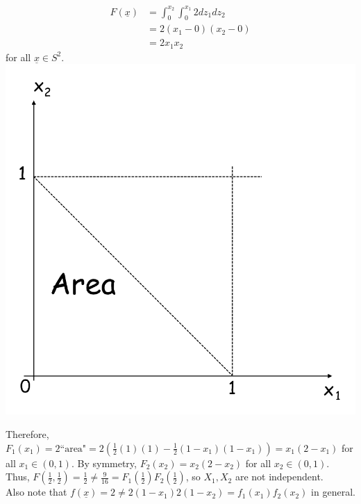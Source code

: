 \documentclass{article}
\begin{document}
\begin{myex}{}{}
\begin{enumerate}
				\begin{align*}
						F(\underline{x})&=\int_{0}^{x_2}\int_{0}^{x_1}2dz_1dz_2\\
						&=2(x_1-0)(x_2-0)\\
						&=2x_1x_2
				\end{align*}
				for all $\underline{x}\in S^2$.\\
				\includegraphics[scale=.5]{graph3.png}
				
				Therefore, $F_1(x_1)=2\mbox{``area"}=2(\frac{1}{2}(1)(1)-\frac{1}{2}(1-x_1)(1-x_1))=x_1(2-x_1)$ for all $x_1\in(0, 1)$. By symmetry, $F_2(x_2)=x_2(2-x_2)$ for all $x_2\in(0, 1)$.\\
				
				Thus, $F(\frac{1}{2}, \frac{1}{2})=\frac{1}{2}\neq\frac{9}{16}=F_1(\frac{1}{2})F_2(\frac{1}{2})$, so $X_1, X_2$ are not independent.\\
				
				Also note that $f(\underline{x})=2\neq2(1-x_1)2(1-x_2)=f_1(x_1)f_2(x_2)$ in general.
		\end{enumerate}
	\end{myex}
	
\end{document}

